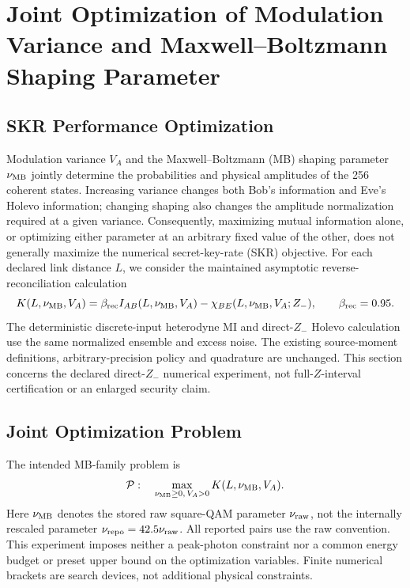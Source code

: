 \section{Joint Optimization of Modulation Variance and Maxwell--Boltzmann Shaping Parameter}
\label{sec:joint-modulation-optimization}

\subsection{SKR Performance Optimization}
Modulation variance $V_A$ and the Maxwell--Boltzmann (MB) shaping parameter
$\nu_{\rm MB}$ jointly determine the probabilities and physical amplitudes
of the 256 coherent states. Increasing variance changes both Bob's information
and Eve's Holevo information; changing shaping also changes the amplitude
normalization required at a given variance. Consequently, maximizing mutual
information alone, or optimizing either parameter at an arbitrary fixed value
of the other, does not generally maximize the numerical secret-key-rate (SKR)
objective. For each declared link distance $L$, we consider the maintained
asymptotic reverse-reconciliation calculation
\begin{equation}
 K(L,\nu_{\rm MB},V_A)=\beta_{\rm rec}I_{AB}(L,\nu_{\rm MB},V_A)
 -\chi_{BE}(L,\nu_{\rm MB},V_A;Z_-),\qquad \beta_{\rm rec}=0.95.
 \label{eq:joint-skr-objective}
\end{equation}
The deterministic discrete-input heterodyne MI and direct-$Z_-$ Holevo
calculation use the same normalized ensemble and excess noise. The existing
source-moment definitions, arbitrary-precision policy and quadrature are
unchanged. This section concerns the declared direct-$Z_-$ numerical experiment,
not full-$Z$-interval certification or an enlarged security claim.

\subsection{Joint Optimization Problem}
The intended MB-family problem is
\begin{equation}
 \mathcal P:\quad\max_{\nu_{\rm MB}\ge0,\,V_A>0}
 K(L,\nu_{\rm MB},V_A).
 \label{eq:joint-modulation-problem}
\end{equation}
Here $\nu_{\rm MB}$ denotes the stored raw square-QAM parameter
$\nu_{\rm raw}$, not the internally rescaled parameter
$\nu_{\rm repo}=42.5\nu_{\rm raw}$. All reported pairs use the raw convention.
This experiment imposes neither a peak-photon constraint nor a common energy
budget or preset upper bound on the optimization variables. Finite numerical
brackets are search devices, not additional physical constraints.

